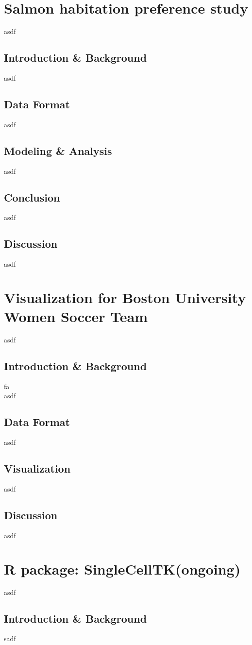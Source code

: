 \documentclass{article}
\begin{document}
	\section{Salmon habitation preference study}
	asdf
	\subsection{Introduction \& Background}
	asdf
	\subsection{Data Format}
	asdf
	\subsection{Modeling \& Analysis}
	asdf
	\subsection{Conclusion}
	asdf
	\subsection{Discussion}
	asdf
	
	\section{Visualization for Boston University Women Soccer Team}
	asdf
	\subsection{Introduction \& Background}
	fa\\asdf
	\subsection{Data Format}
	asdf
	\subsection{Visualization}
	asdf
	\subsection{Discussion}
	asdf	
	
	\section{R package: SingleCellTK(ongoing)}
	asdf
	\subsection{Introduction \& Background}
	sadf
\end{document}
